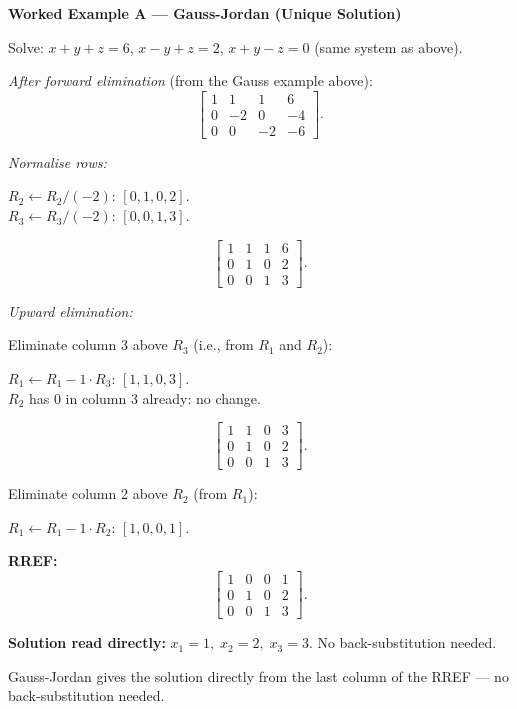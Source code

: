 \documentclass[12pt,a4paper]{article}
\begin{document}
\textbf{Worked Example A --- Gauss-Jordan (Unique Solution)}

Solve: $x + y + z = 6$, $x - y + z = 2$, $x + y - z = 0$ (same system as above).

\textit{After forward elimination} (from the Gauss example above):
\[
\left[\begin{array}{ccc|c}
1 & 1 & 1 & 6 \\
0 & -2 & 0 & -4 \\
0 & 0 & -2 & -6
\end{array}\right].
\]

\textit{Normalise rows:}

$R_2 \leftarrow R_2 / (-2)$: $[0, 1, 0, 2]$.\\
$R_3 \leftarrow R_3 / (-2)$: $[0, 0, 1, 3]$.

\[
\left[\begin{array}{ccc|c}
1 & 1 & 1 & 6 \\
0 & 1 & 0 & 2 \\
0 & 0 & 1 & 3
\end{array}\right].
\]

\textit{Upward elimination:}

Eliminate column 3 above $R_3$ (i.e., from $R_1$ and $R_2$):

$R_1 \leftarrow R_1 - 1 \cdot R_3$: $[1, 1, 0, 3]$.\\
$R_2$ has $0$ in column 3 already: no change.

\[
\left[\begin{array}{ccc|c}
1 & 1 & 0 & 3 \\
0 & 1 & 0 & 2 \\
0 & 0 & 1 & 3
\end{array}\right].
\]

Eliminate column 2 above $R_2$ (from $R_1$):

$R_1 \leftarrow R_1 - 1 \cdot R_2$: $[1, 0, 0, 1]$.

\textbf{RREF:}
\[
\left[\begin{array}{ccc|c}
1 & 0 & 0 & 1 \\
0 & 1 & 0 & 2 \\
0 & 0 & 1 & 3
\end{array}\right].
\]

\textbf{Solution read directly:} $x_1 = 1,\; x_2 = 2,\; x_3 = 3$. No back-substitution needed.

\begin{learnbox}
Gauss-Jordan gives the solution directly from the last column of the RREF --- no back-substitution needed.
\end{learnbox}
\end{document}

